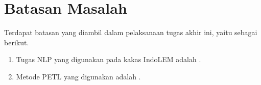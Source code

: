 \section{Batasan Masalah}
\label{sec:batasan-masalah}

Terdapat batasan yang diambil dalam pelaksanaan tugas akhir ini, yaitu sebagai berikut.

\begin{enumerate}
    \item Tugas NLP yang digunakan pada kakas IndoLEM adalah \nlptask.
    \item Metode PETL yang digunakan adalah \methodPETL.
\end{enumerate}
